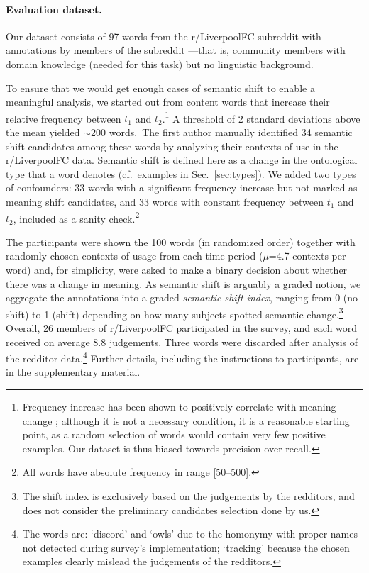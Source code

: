 

\paragraph{Evaluation dataset.}

Our dataset consists of 97 words from the r/LiverpoolFC subreddit with
annotations by members of the subreddit ---that is, community members
with domain knowledge (needed for this task) but no linguistic
background.

To ensure that we would get enough cases of semantic shift to enable a
meaningful analysis, we started out from content words that increase
their relative frequency between $t_1$ and $t_2$.\footnote{Frequency
  increase has been shown to positively correlate with meaning change
  \cite{wijaya2011understanding,kulkarni2015statistically}; although
  it is not a necessary condition, it is a reasonable starting point,
  as a random selection of words would contain very few positive
  examples. Our dataset is thus biased towards precision over recall.}
A threshold of 2 standard deviations above the mean yielded
$\sim$200 words.~The first author manually identified 34 semantic
shift candidates among these words by analyzing their contexts of use
in the r/LiverpoolFC data.  Semantic shift is defined here as a change
in the ontological type that a word denotes (cf.~examples in
Sec.~\ref{sec:types}). We added two types of confounders: 33 words
with a significant frequency increase but not marked as meaning
shift candidates, and 33 words with constant frequency between $t_1$
and $t_2$, included as a sanity check.\footnote{All words have
  absolute frequency in range [50--500].}

The participants were shown the 100 words (in randomized order)
together with randomly chosen contexts of usage from each time period
($\mu$=4.7 contexts per word) and, for simplicity, were asked to make
a binary decision about whether there was a change in meaning. 
As semantic shift is arguably a graded notion, we 
aggregate the annotations into a graded \emph{semantic shift index},
ranging from 0 (no shift) to 1 (shift) depending on how many subjects
spotted semantic change.\footnote{The shift index is exclusively based
  on the judgements by the redditors, and does not consider the
  preliminary candidates selection done by us.}  Overall, 26 members
of r/LiverpoolFC participated in the survey, and each word received on
average 8.8 judgements. Three words were discarded after analysis of
the redditor data.\footnote{The words are: `discord' and `owls' due to
  the homonymy with proper names not detected during survey's
  implementation; `tracking' because the chosen examples clearly
  mislead the judgements of the redditors.}  Further details,
including the instructions to participants, are in the supplementary
material.

